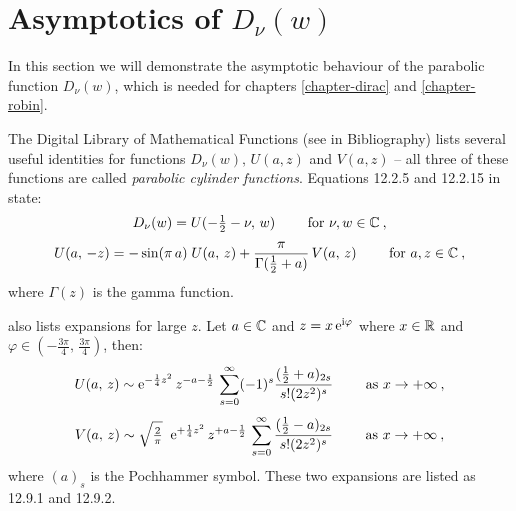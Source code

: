 \section{Asymptotics of \texorpdfstring{$D_\nu(w)$}{Dₙ(w)}}
\label{apdx-parabolic-cylinder-asymp}

In this section we will demonstrate the asymptotic behaviour of the parabolic function $D_\nu(w)$, which is needed for chapters \ref{chapter-dirac} and \ref{chapter-robin}.

The Digital Library of Mathematical Functions (see \cite{DLMF} in Bibliography) lists several useful identities for functions $D_\nu(w), \, U(a, z)$ and $V(a, z)$ – all three of these functions are called \textit{parabolic cylinder functions}. Equations 12.2.5 and 12.2.15 in \cite{DLMF} state:
\begin{gather}
	D_\nu(w) = U(-\tfrac{1}{2} - \nu, \, w)
	\qquad \text{ for } \nu, w \in \mathbb{C}
	\: ,
	\label{eqn-D-via-U}
	\\[3pt]
	U(a, \, -z)
	= - \sin(\pi \, a)
	\; U(a, \, z)
	+ \frac{\pi}{\Gamma(\tfrac{1}{2} + a)}
	\, V(a, \, z)
	\qquad \text{ for } a, z \in \mathbb{C}
	\: ,
	\label{eqn-U-via-U-V}
\end{gather}
where $\Gamma(z)$ is the gamma function.

\cite{DLMF} also lists expansions for large $z$. Let $a\in\mathbb{C}$ and $z = x \, \mathrm{e}^{\mathrm{i} \varphi}$ where $x \in \mathbb{R}$ and $\varphi \in (-\tfrac{3\pi}{4}, \, \tfrac{3\pi}{4})$, then:
\begin{gather}
	U(a, \, z)
	\sim \mathrm{e}^{-\frac{1}{4} z^2} \,
	z^{-a-\frac{1}{2}} \,
	\sum_{s=0}^\infty (-1)^s \frac{(\tfrac{1}{2} + a)_{2s}}{s! (2z^2)^s}
	\qquad \text{ as } x \to +\infty
	\: ,
	\label{eqn-U-asymptotic}
	\\[3pt]
	V(a, \, z)
	\sim \sqrt{\tfrac{2}{\pi}} \;\;
	\mathrm{e}^{+\frac{1}{4} z^2} \,
	z^{+a-\frac{1}{2}} \,
	\sum_{s=0}^\infty \frac{(\tfrac{1}{2} - a)_{2s}}{s! (2z^2)^s}
	\qquad \text{ as } x \to +\infty
	\: ,
	\label{eqn-V-asymptotic}
\end{gather}
where $(a)_s$ is the Pochhammer symbol. These two expansions are listed as 12.9.1 and 12.9.2.

